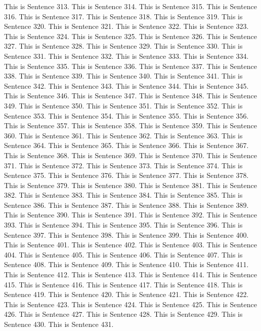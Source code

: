 \documentclass{article}
\begin{document}
This is Sentence 313.
This is Sentence 314.
This is Sentence 315.
This is Sentence 316.
This is Sentence 317.
This is Sentence 318.
This is Sentence 319.
This is Sentence 320.
This is Sentence 321.
This is Sentence 322.
This is Sentence 323.
This is Sentence 324.
This is Sentence 325.
This is Sentence 326.
This is Sentence 327.
This is Sentence 328.
This is Sentence 329.
This is Sentence 330.
This is Sentence 331.
This is Sentence 332.
This is Sentence 333.
This is Sentence 334.
This is Sentence 335.
This is Sentence 336.
This is Sentence 337.
This is Sentence 338.
This is Sentence 339.
This is Sentence 340.
This is Sentence 341.
This is Sentence 342.
This is Sentence 343.
This is Sentence 344.
This is Sentence 345.
This is Sentence 346.
This is Sentence 347.
This is Sentence 348.
This is Sentence 349.
This is Sentence 350.
This is Sentence 351.
This is Sentence 352.
This is Sentence 353.
This is Sentence 354.
This is Sentence 355.
This is Sentence 356.
This is Sentence 357.
This is Sentence 358.
This is Sentence 359.
This is Sentence 360.
This is Sentence 361.
This is Sentence 362.
This is Sentence 363.
This is Sentence 364.
This is Sentence 365.
This is Sentence 366.
This is Sentence 367.
This is Sentence 368.
This is Sentence 369.
This is Sentence 370.
This is Sentence 371.
This is Sentence 372.
This is Sentence 373.
This is Sentence 374.
This is Sentence 375.
This is Sentence 376.
This is Sentence 377.
This is Sentence 378.
This is Sentence 379.
This is Sentence 380.
This is Sentence 381.
This is Sentence 382.
This is Sentence 383.
This is Sentence 384.
This is Sentence 385.
This is Sentence 386.
This is Sentence 387.
This is Sentence 388.
This is Sentence 389.
This is Sentence 390.
This is Sentence 391.
This is Sentence 392.
This is Sentence 393.
This is Sentence 394.
This is Sentence 395.
This is Sentence 396.
This is Sentence 397.
This is Sentence 398.
This is Sentence 399.
This is Sentence 400.
This is Sentence 401.
This is Sentence 402.
This is Sentence 403.
This is Sentence 404.
This is Sentence 405.
This is Sentence 406.
This is Sentence 407.
This is Sentence 408.
This is Sentence 409.
This is Sentence 410.
This is Sentence 411.
This is Sentence 412.
This is Sentence 413.
This is Sentence 414.
This is Sentence 415.
This is Sentence 416.
This is Sentence 417.
This is Sentence 418.
This is Sentence 419.
This is Sentence 420.
This is Sentence 421.
This is Sentence 422.
This is Sentence 423.
This is Sentence 424.
This is Sentence 425.
This is Sentence 426.
This is Sentence 427.
This is Sentence 428.
This is Sentence 429.
This is Sentence 430.
This is Sentence 431.
\end{document}
